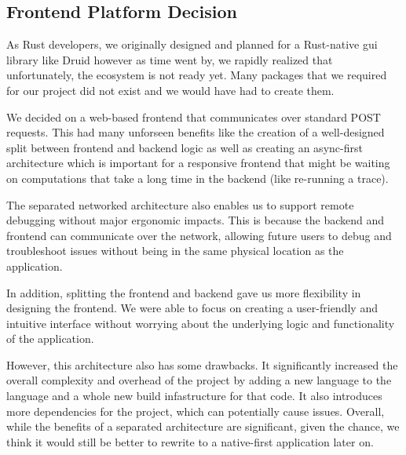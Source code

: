 \newpage %
\begin{doublespacing} %
\setcounter{page}{1} %






\newpage %
\begin{appendices}

% 

\chapter{Frontend Platform Decision}
    \label{sec:frontend}
As Rust developers, we originally designed and planned for a Rust-native gui library like Druid \cite{druid} however as time went by, we rapidly realized that unfortunately, the ecosystem is not ready yet. Many packages that we required for our project did not exist and we would have had to create them.

We decided on a web-based frontend that communicates over standard POST requests. This had many unforseen benefits like the creation of a well-designed split between frontend and backend logic as well as creating an async-first architecture which is important for a responsive frontend that might be waiting on computations that take a long time in the backend (like re-running a trace). 

The separated networked architecture also enables us to support remote debugging without major ergonomic impacts. This is because the backend and frontend can communicate over the network, allowing future users to debug and troubleshoot issues without being in the same physical location as the application.

In addition, splitting the frontend and backend gave us more flexibility in designing the frontend. We were able to focus on creating a user-friendly and intuitive interface without worrying about the underlying logic and functionality of the application.

However, this architecture also has some drawbacks. It significantly increased the overall complexity and overhead of the project by adding a new language to the language and a whole new build infastructure for that code. It also introduces more dependencies for the project, which can potentially cause issues. Overall, while the benefits of a separated architecture are significant, given the chance, we think it would still be better to rewrite to a native-first application later on. 
\newpage



\end{appendices}

\newpage %
\end{doublespacing} %

